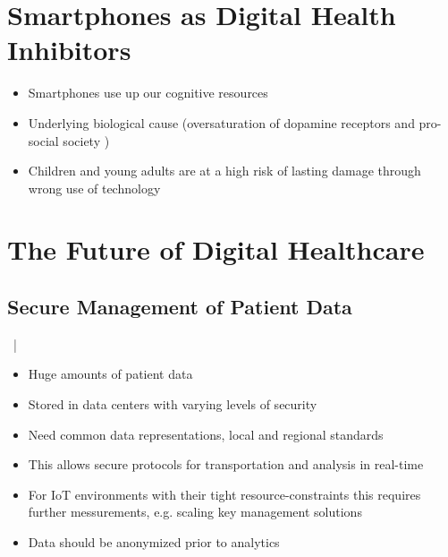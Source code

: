 \documentclass[xcolor=dvipsnames, aspectratio=1610]{beamer}
\begin{document}

\section{Smartphones as Digital Health Inhibitors}%
\label{sec:smartphones_as_digital_health_inhibitors}

\begin{frame}{\secname}
    \begin{itemize}[<+->]
        \item Smartphones use up our cognitive resources \cite{ward2017brain}
        \item Underlying biological cause (oversaturation of dopamine receptors \cite{nieoullon2002dopamine, dopamineRole} and pro-social society \cite{sapiens})
        \item Children and young adults are at a high risk of lasting damage through wrong use of technology \cite{crone2018media}
    \end{itemize}
\end{frame}


\section{The Future of Digital Healthcare}%
\label{sec:the_future_of_digital_healthcare}

\subsection{Secure Management of Patient Data}%
\label{sub:secure_management_of_patient_data}

\begin{frame}{\secname\ | \subsecname}
    \begin{itemize}[<+->]
        \item Huge amounts of patient data \cite{gopal2019digital}
        \item Stored in data centers with varying levels of security \cite{patil2014big}
        \item Need common data representations, local and regional standards \cite{patil2014big}
        \item This allows secure protocols for transportation and analysis in real-time \cite{patil2014big}
        \item For IoT environments with their tight resource-constraints this requires further messurements, e.g. scaling key management solutions \cite{patil2014big}
        \item Data should be anonymized prior to analytics
    \end{itemize}
\end{frame}
\end{document}

